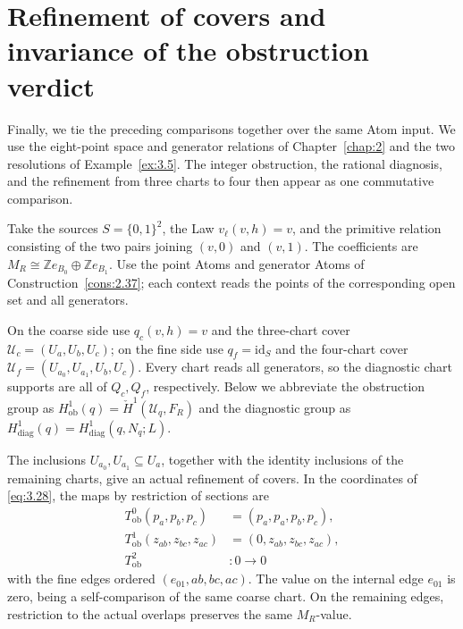 \section{Refinement of covers and invariance of the obstruction verdict}\label{sec:3.11}

Finally, we tie the preceding comparisons together over the same Atom input.
We use the eight-point space and generator relations of Chapter~\ref{chap:2} and the
two resolutions of Example~\ref{ex:3.5}.
The integer obstruction, the rational diagnosis, and the refinement from three
charts to four then appear as one commutative comparison.

\begin{construction}\label{cons:3.42}

Take the sources $S=\{0,1\}^2$, the Law $v_\ell(v,h)=v$, and the primitive relation
consisting of the two pairs joining $(v,0)$ and $(v,1)$.
The coefficients are $M_R\cong\mathbb{Z}e_{B_0}\oplus\mathbb{Z}e_{B_1}$.
Use the point Atoms and generator Atoms of Construction~\ref{cons:2.37}; each
context reads the points of the corresponding open set and all generators.

On the coarse side use $q_c(v,h)=v$ and the three-chart cover
$\mathcal{U}_c=(U_a,U_b,U_c)$; on the fine side use $q_f=\mathrm{id}_S$ and the
four-chart cover $\mathcal{U}_f=(U_{a_0},U_{a_1},U_b,U_c)$.
Every chart reads all generators, so the diagnostic chart supports are all of
$Q_c,Q_f$, respectively.
Below we abbreviate the obstruction group as
$H^1_{\mathrm{ob}}(q)=\check H^1(\mathcal{U}_q,F_R)$ and the diagnostic group as
$H^1_{\mathrm{diag}}(q)=H^1_{\mathrm{diag}}(q,N_q;L)$.

The inclusions $U_{a_0},U_{a_1}\subseteq U_a$, together with the identity inclusions
of the remaining charts, give an actual refinement of covers.
In the coordinates of \eqref{eq:3.28}, the maps by restriction of sections are
\begin{equation*}
\begin{aligned}
T_{\mathrm{ob}}^0(p_a,p_b,p_c)&=(p_a,p_a,p_b,p_c),\\
T_{\mathrm{ob}}^1(z_{ab},z_{bc},z_{ac})&=(0,z_{ab},z_{bc},z_{ac}),\\
T_{\mathrm{ob}}^2&:0\longrightarrow0
\end{aligned}
\tag{3.37}\label{eq:3.37}
\end{equation*}
with the fine edges ordered $(e_{01},ab,bc,ac)$.
The value on the internal edge $e_{01}$ is zero, being a self-comparison of the same
coarse chart.
On the remaining edges, restriction to the actual overlaps preserves the same
$M_R$-value.


\end{construction}
